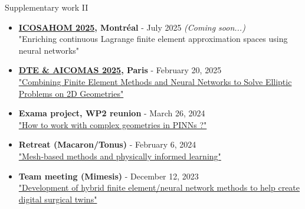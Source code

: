 \begin{frame}{Supplementary work II}
    \small 

	\begin{tcolorbox}[
		skin=bicolor,
		colback=other, %
		colbacklower=other!20!white,
		title={Talks},
		colframe=title, %
		arc=2mm, %
		boxrule=0.5pt, %
		breakable, enhanced jigsaw,
		width=\linewidth,
		opacityback=0.1
		]
		
		\begin{itemize}[\textcolor{other}{$\blacktriangleright$}]
            \item \textbf{\href{https://icosahom2025.org/}{ICOSAHOM 2025}, Montréal} - July 2025 \textit{(Coming soon...)} \\
            "Enriching continuous Lagrange finite element approximation spaces using neural networks" 
            \item \textbf{\href{https://dte_aicomas_2025.iacm.info/organizers}{DTE \& AICOMAS 2025}, Paris} - February 20, 2025 \\
            \href{https://flecourtier.github.io/these2023/these2023/1.0.3/_attachments/presentation/2025_02_20.pdf}{"Combining Finite Element Methods and Neural Networks to Solve Elliptic Problems on 2D Geometries"}
			\item \textbf{Exama project, WP2 reunion} - March 26, 2024 \\
			\href{https://flecourtier.github.io/these2023/these2023/1.0.3/_attachments/presentation/2024_03_26.pdf}{"How to work with complex geometries in PINNs ?"}
			\item \textbf{Retreat (Macaron/Tonus)} - February 6, 2024 \\
			\href{https://flecourtier.github.io/these2023/these2023/1.0.3/_attachments/presentation/2024_02_06.pdf}{"Mesh-based methods and physically informed learning"}
			\item \textbf{Team meeting (Mimesis)} - December 12, 2023 \\
            \href{https://flecourtier.github.io/these2023/these2023/1.0.3/_attachments/presentation/2023_12_12.pdf}{"Development of hybrid finite element/neural network methods to help create digital surgical twins"}
		\end{itemize}
	\end{tcolorbox}
\end{frame}

